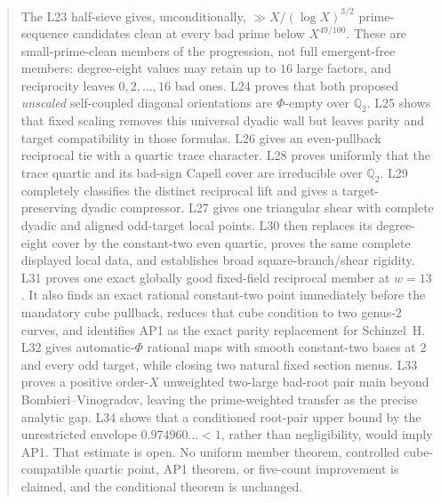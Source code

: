 \documentclass[11pt]{amsart}
\theoremstyle{definition}
\theoremstyle{remark}
\newcommand{\Q}{\mathbb{Q}}
\begin{document}
\begin{abstract}
The L23 half-sieve gives, unconditionally, \(\gg
X/(\log X)^{3/2}\) prime-sequence candidates clean at every bad prime
below \(X^{49/100}\).  These are small-prime-clean members of the
progression, not full emergent-free members: degree-eight values may retain
up to \(16\) large factors, and reciprocity leaves \(0,2,\ldots,16\) bad
ones.  L24 proves that both proposed \emph{unscaled} self-coupled diagonal
orientations are \(\Phi\)-empty over \(\Q_2\).  L25 shows that fixed
scaling removes this universal dyadic wall but leaves parity and target
compatibility in those formulas.  L26 gives an even-pullback reciprocal
tie with a quartic trace character.  L28 proves uniformly that the trace
quartic and its bad-sign Capell cover are irreducible over \(\Q_2\).
L29 completely classifies the distinct reciprocal lift and gives a
target-preserving dyadic compressor.  L27 gives one triangular shear
with complete dyadic and aligned odd-target local points.  L30 then
replaces its degree-eight cover by the constant-two even quartic,
proves the same complete displayed local data, and establishes broad
square-branch/shear rigidity.  L31 proves one exact globally good
fixed-field reciprocal member at \(w=13\).  It also finds an exact
rational constant-two point immediately before the mandatory cube
pullback, reduces that cube condition to two genus-\(2\) curves, and
identifies AP1 as the exact parity replacement for Schinzel~H.  L32
gives automatic-\(\Phi\) rational maps with smooth constant-two bases at
\(2\) and every odd target, while closing two natural fixed section
menus.  L33 proves a positive order-\(X\) unweighted two-large
bad-root pair main beyond Bombieri--Vinogradov, leaving the
prime-weighted transfer as the precise analytic gap.  L34 shows that a
conditioned root-pair upper bound by the unrestricted envelope
\(0.974960\ldots<1\), rather than negligibility, would imply AP1.  That
estimate is open.
No uniform member theorem, controlled cube-compatible quartic point,
AP1 theorem, or five-count improvement is claimed, and the conditional
theorem is unchanged.
\end{abstract}
\end{document}
